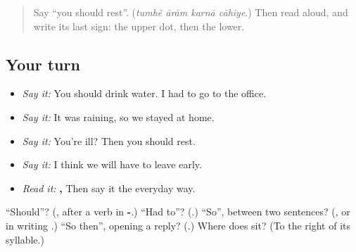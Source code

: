 \label{lesson:HI-R281-advice-and-reasons}



\begin{quote}
Say \textquotedblleft{}you should rest\textquotedblright{}. (\emph{tumhẽ ārām karnā cāhiye}.) Then read \textbf{} aloud, and write its last sign: the upper dot, then the lower.
\end{quote}

\subsection*{Your turn}
\begin{itemize}
\raggedright
  \item \emph{Say it:} You should drink water. I had to go to the office.
  \item \emph{Say it:} It was raining, so we stayed at home.
  \item \emph{Say it:} You're ill? Then you should rest.
  \item \emph{Say it:} I think we will have to leave early.
  \item \emph{Read it:} \textbf{  ,    } Then say it the everyday way.
\end{itemize}

\begin{tcolorbox}[breakable,colback=teal!4,colframe=teal!35!black,title={Before you move on}]
\textquotedblleft{}Should\textquotedblright{}? (\textbf{}, after a verb in \textbf{-}.) \textquotedblleft{}Had to\textquotedblright{}? (\textbf{}.) \textquotedblleft{}So\textquotedblright{}, between two sentences? (\textbf{}, or in writing \textbf{}.) \textquotedblleft{}So then\textquotedblright{}, opening a reply? (\textbf{}.) Where does \textbf{} sit? (To the right of its syllable.)
\end{tcolorbox}
